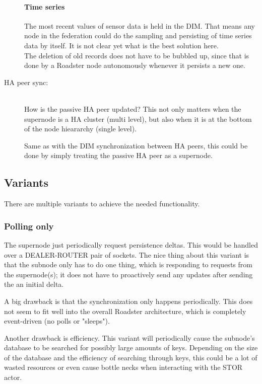 \begin{description}
		\paragraph{Time series} The most recent values of sensor data
		is held in the DIM. That means any node in the federation could
		do the sampling and persisting of time series data by itself.
		{\color{red}It is not clear yet what is the best solution here.}\\
		The deletion of old records does not have to be bubbled up,
		since that is done by a Roadster node autonomously whenever it
		persists a new one.

	\item [HA peer sync:]\hfill\\
		How is the passive HA peer updated?
		This not only matters when the supernode is a HA cluster (multi
		level), but also when it is at the bottom of the node hieararchy
		(single level).

		Same as with the DIM synchronization between HA peers, this
		could be done by simply treating the passive HA peer as a
		supernode.
\end{description}


\subsection{Variants}
There are multiple variants to achieve the needed functionality.

\subsubsection{Polling only}
The supernode just periodically request persistence
deltas. This would be handled over a DEALER-ROUTER pair of sockets. The nice
thing about this variant is that the subnode only has to do one thing, which is
responding to requests from the supernode(s); it does not have to proactively
send any updates after sending the an initial delta.

A big drawback is that the synchronization only happens periodically. This
does not seem to fit well into the overall Roadster architecture, which is
completely event-driven (no polls or "sleeps").

Another drawback is efficiency. This variant will periodically cause the
subnode's database to be searched for possibly large amounts of keys. Depending on the size of the
database and the efficiency of searching through keys, this could be a lot of
wasted resources or even cause bottle necks when interacting with the STOR
actor.

